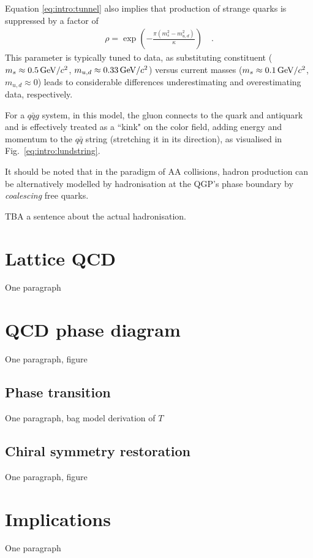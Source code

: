 Equation \ref{eq:intro:tunnel} also implies that production of strange quarks is suppressed by a factor of 
\begin{align}
\rho = \exp \left( -\frac{\pi (m^2_s - m^2_{u,d})}{\kappa} \right) \quad .
\end{align}
This parameter is typically tuned to data, as substituting constituent ($m_s \approx 0.5 \text{\,GeV/$c^2$}$, $m_{u,d} \approx 0.33 \text{\,GeV/$c^2$}$) versus current masses ($m_s \approx 0.1 \text{\,GeV/$c^2$}$, $m_{u,d} \approx 0$) leads to considerable differences underestimating and overestimating data, respectively.

For a $q\bar{q}g$ system, in this model, the gluon connects to the quark and antiquark and is effectively treated as a ``kink" on the color field, adding energy and momentum to the $q\bar{q}$ string (stretching it in its direction), as visualised in Fig.~\ref{eq:intro:lundstring}.

It should be noted that in the paradigm of AA collisions, hadron production can be alternatively modelled by hadronisation at the QGP's phase boundary by \textit{coalescing} free quarks. 

TBA a sentence about the actual hadronisation.


\section{Lattice QCD}

One paragraph

\section{QCD phase diagram}

One paragraph, figure

\subsection{Phase transition}

One paragraph, bag model derivation of $T$

\subsection{Chiral symmetry restoration}

One paragraph, figure

\section{Implications}

One paragraph